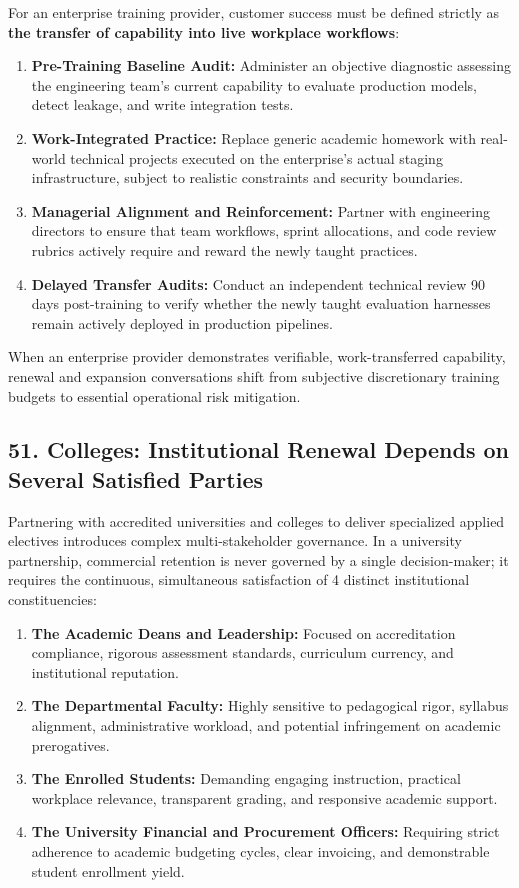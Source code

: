 For an enterprise training provider, customer success must be defined strictly as \textbf{the transfer of capability into live workplace workflows}:
\begin{enumerate}[leftmargin=*]
\item \textbf{Pre-Training Baseline Audit:} Administer an objective diagnostic assessing the engineering team's current capability to evaluate production models, detect leakage, and write integration tests.
\item \textbf{Work-Integrated Practice:} Replace generic academic homework with real-world technical projects executed on the enterprise's actual staging infrastructure, subject to realistic constraints and security boundaries.
\item \textbf{Managerial Alignment and Reinforcement:} Partner with engineering directors to ensure that team workflows, sprint allocations, and code review rubrics actively require and reward the newly taught practices.
\item \textbf{Delayed Transfer Audits:} Conduct an independent technical review 90 days post-training to verify whether the newly taught evaluation harnesses remain actively deployed in production pipelines.
\end{enumerate}

When an enterprise provider demonstrates verifiable, work-transferred capability, renewal and expansion conversations shift from subjective discretionary training budgets to essential operational risk mitigation.

\subsection*{51. Colleges: Institutional Renewal Depends on Several Satisfied Parties}

Partnering with accredited universities and colleges to deliver specialized applied electives introduces complex multi-stakeholder governance. In a university partnership, commercial retention is never governed by a single decision-maker; it requires the continuous, simultaneous satisfaction of 4 distinct institutional constituencies:

\begin{enumerate}[leftmargin=*]
\item \textbf{The Academic Deans and Leadership:} Focused on accreditation compliance, rigorous assessment standards, curriculum currency, and institutional reputation.
\item \textbf{The Departmental Faculty:} Highly sensitive to pedagogical rigor, syllabus alignment, administrative workload, and potential infringement on academic prerogatives.
\item \textbf{The Enrolled Students:} Demanding engaging instruction, practical workplace relevance, transparent grading, and responsive academic support.
\item \textbf{The University Financial and Procurement Officers:} Requiring strict adherence to academic budgeting cycles, clear invoicing, and demonstrable student enrollment yield.
\end{enumerate}

